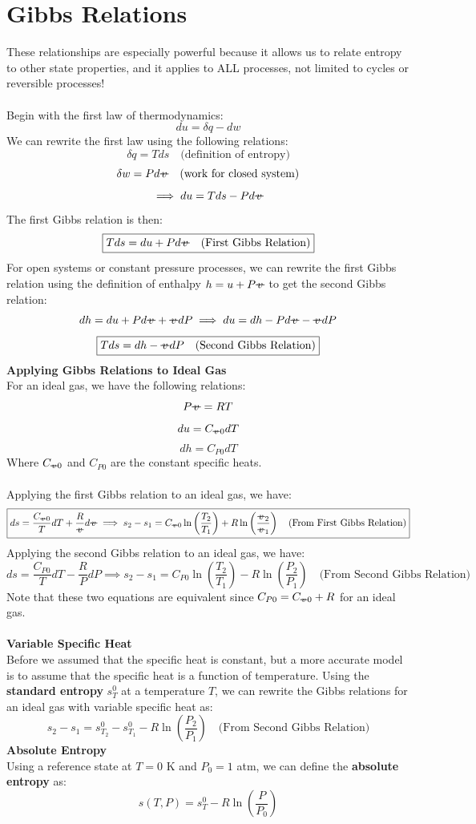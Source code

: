 \documentclass[12pt]{article}
\newcommand{\svol}{%
  \mathord{\text{\ooalign{%
    \hfil$v$\hfil\cr
    \hfil\rule[0.6ex]{0.8em}{0.5pt}\hfil
  }}}%
}
\begin{document}
\section*{Gibbs Relations}
These relationships are especially powerful because it allows us to relate entropy to other state properties, and it applies to ALL processes, not limited to cycles or reversible processes!\\\\
Begin with the first law of thermodynamics:
\[du = \delta q - dw\]
We can rewrite the first law using the following relations:
\[\delta q = Tds\quad \text{(definition of entropy)}\]
\[\delta w = Pd\svol\quad \text{(work for closed system)}\]
\[\implies du = Tds - Pd\svol\]
The first Gibbs relation is then:
\[\boxed{Tds = du + Pd\svol\quad \text{(First Gibbs Relation)}}\]
For open systems or constant pressure processes, we can rewrite the first Gibbs relation using the definition of enthalpy $h = u + P\svol$ to get the second Gibbs relation:
\[dh = du+Pd\svol+\svol dP \implies du= dh - Pd\svol-\svol dP\]
\[\boxed{Tds = dh - \svol dP\quad \text{(Second Gibbs Relation)}}\]
\textbf{Applying Gibbs Relations to Ideal Gas}\\
For an ideal gas, we have the following relations:
\[P\svol = RT\]
\[du = C_{\svol0}dT\]
\[dh = C_{P0}dT\]
Where $C_{\svol0}$ and $C_{P0}$ are the constant specific heats.\\\\
Applying the first Gibbs relation to an ideal gas, we have:
\[\boxed{ds =\frac{C_{\svol0}}{T}dT+\frac{R}{\svol}d\svol \implies s_2-s_1 = C_{\svol0}\ln\left(\frac{T_2}{T_1}\right)+R \ln\left(\frac{\svol_2}{\svol_1}\right) \quad \text{(From First Gibbs Relation)}}\]
Applying the second Gibbs relation to an ideal gas, we have:
\[\boxed{ds = \frac{C_{P0}}{T}dT-\frac{R}{P}dP \implies s_2-s_1 = C_{P0}\ln\left(\frac{T_2}{T_1}\right)-R \ln\left(\frac{P_2}{P_1}\right) \quad \text{(From Second Gibbs Relation)}}\]
Note that these two equations are equivalent since $C_{P0} = C_{\svol0} + R$ for an ideal gas.\\\\
\textbf{Variable Specific Heat}\\
Before we assumed that the specific heat is constant, but a more accurate model is to assume that the specific heat is a function of temperature. Using the \textbf{standard entropy} $s_T^0$ at a temperature $T$, we can rewrite the Gibbs relations for an ideal gas with variable specific heat as:
\[\boxed{s_2-s_1 = s_{T_2}^0 - s_{T_1}^0 - R \ln\left(\frac{P_2}{P_1}\right) \quad \text{(From Second Gibbs Relation)}}\]
\textbf{Absolute Entropy}\\
Using a reference state at $T=0$ K and $P_0 = 1$ atm, we can define the \textbf{absolute entropy} as:
\[\boxed{s(T,P) = s_T^0-R\ln\left(\frac{P}{P_0}\right)}\]
\end{document}
